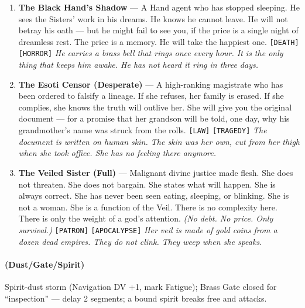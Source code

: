 \begin{enumerate}
  \hfill \textit{She writes messages on water. The words vanish, but the Sisters cannot read them. Her reflection is missing. She sold it for a name.}
\item[Q] \textbf{The Black Hand's Shadow} --- A Hand agent who has stopped sleeping. He sees the Sisters' work in his dreams. He knows he cannot leave. He will not betray his oath --- but he might fail to see you, if the price is a single night of dreamless rest. The price is a memory. He will take the happiest one. \texttt{[DEATH]} \texttt{[HORROR]}
  \hfill \textit{He carries a brass bell that rings once every hour. It is the only thing that keeps him awake. He has not heard it ring in three days.}
\item[K] \textbf{The Esoti Censor (Desperate)} --- A high-ranking magistrate who has been ordered to falsify a lineage. If she refuses, her family is erased. If she complies, she knows the truth will outlive her. She will give you the original document --- for a promise that her grandson will be told, one day, why his grandmother's name was struck from the rolls. \texttt{[LAW]} \texttt{[TRAGEDY]}
  \hfill \textit{The document is written on human skin. The skin was her own, cut from her thigh when she took office. She has no feeling there anymore.}
\item[A] \textbf{The Veiled Sister (Full)} --- Malignant divine justice made flesh. She does not threaten. She does not bargain. She states what will happen. She is always correct. She has never been seen eating, sleeping, or blinking. She is not a woman. She is a function of the Veil. There is no complexity here. There is only the weight of a god's attention. \textit{(No debt. No price. Only survival.)} \texttt{[PATRON]} \texttt{[APOCALYPSE]}
  \hfill \textit{Her veil is made of gold coins from a dozen dead empires. They do not clink. They weep when she speaks.}
\end{enumerate}

\paragraph*{(Dust/Gate/Spirit)} Spirit-dust storm (Navigation DV +1, mark Fatigue); Brass Gate closed for ``inspection'' --- delay 2 segments; a bound spirit breaks free and attacks.

